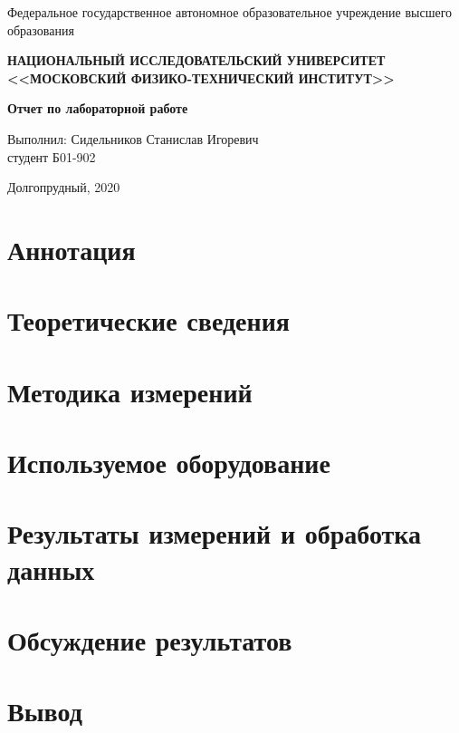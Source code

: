


\begin{center}
    
    \normalsize{Федеральное государственное автономное образовательное учреждение высшего образования}
    
    \textbf{НАЦИОНАЛЬНЫЙ ИССЛЕДОВАТЕЛЬСКИЙ УНИВЕРСИТЕТ \\ <<МОСКОВСКИЙ ФИЗИКО-ТЕХНИЧЕСКИЙ ИНСТИТУТ>>}
    \vspace{13ex}
    
    \textbf{Отчет по лабораторной работе }
    \vspace{40ex}
\end{center}
\begin{flushright}
    \normalsize{Выполнил: Сидельников Станислав Игоревич \\ студент Б01-902\\}
\end{flushright}
    
\vfill
    
\begin{center}
Долгопрудный, 2020
\end{center}

\thispagestyle{empty} %

\newpage
	\section{Аннотация}
	
	\section{Теоретические сведения}

	\section{Методика измерений}

	\section{Используемое оборудование}
	
	\section{Результаты измерений и обработка данных}

	\section{Обсуждение результатов}
	
	\section{Вывод}


